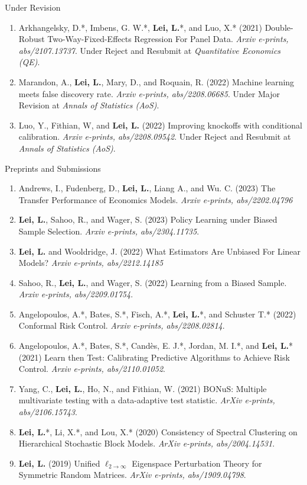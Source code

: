 \documentclass{article}
\begin{document}
\begin{large}
\noindent Under Revision
\end{large}

\begin{enumerate}
\item Arkhangelsky, D.*, Imbens, G. W.*, \textbf{Lei, L.}*, and Luo, X.* (2021) Double-Robust Two-Way-Fixed-Effects Regression For Panel Data. \emph{Arxiv e-prints, abs/2107.13737}. Under Reject and Resubmit at \emph{Quantitative Economics (QE)}.
\item Marandon, A., \textbf{Lei, L.}, Mary, D., and Roquain, R. (2022) Machine learning meets false discovery rate. \emph{Arxiv e-prints, abs/2208.06685}. Under Major Revision at \emph{Annals of Statistics (AoS)}.
\item Luo, Y., Fithian, W, and \textbf{Lei, L.} (2022) Improving knockoffs with conditional calibration. \emph{Arxiv e-prints, abs/2208.09542}. Under Reject and Resubmit at \emph{Annals of Statistics (AoS)}.
\end{enumerate}

\begin{large}
\noindent Preprints and Submissions
\end{large}

\begin{enumerate}
\item Andrews, I., Fudenberg, D., \textbf{Lei, L.}, Liang A., and Wu. C. (2023) The Transfer Performance of Economics Models. \emph{Arxiv e-prints, abs/2202.04796}
\item \textbf{Lei, L.}, Sahoo, R., and Wager, S. (2023) Policy Learning under Biased Sample Selection. \emph{Arxiv e-prints, abs/2304.11735}.  
\item \textbf{Lei, L.} and Wooldridge, J. (2022) What Estimators Are Unbiased For Linear Models? \emph{Arxiv e-prints, abs/2212.14185}
\item Sahoo, R., \textbf{Lei, L.}, and Wager, S. (2022) Learning from a Biased Sample. \emph{Arxiv e-prints, abs/2209.01754}.
\item Angelopoulos, A.*, Bates, S.*, Fisch, A.*, \textbf{Lei, L.}*, and Schuster T.* (2022) Conformal Risk Control. \emph{Arxiv e-prints, abs/2208.02814}.
\item Angelopoulos, A.*, Bates, S.*, Cand\`{e}s, E. J.*, Jordan, M. I.*, and \textbf{Lei, L.}* (2021) Learn then Test: Calibrating Predictive Algorithms to Achieve Risk Control. \emph{Arxiv e-prints, abs/2110.01052}.
\item Yang, C., \textbf{Lei, L.}, Ho, N., and Fithian, W. (2021) BONuS: Multiple multivariate testing with a data-adaptive test statistic. \emph{ArXiv e-prints, abs/2106.15743}.
\item \textbf{Lei, L.}*, Li, X.*, and Lou, X.* (2020) Consistency of Spectral Clustering on Hierarchical Stochastic Block Models. \emph{ArXiv e-prints, abs/2004.14531}.
\item \textbf{Lei, L.} (2019) Unified $\ell_{2\rightarrow\infty}$ Eigenspace Perturbation Theory for Symmetric Random Matrices. \emph{ArXiv e-prints, abs/1909.04798}.
\end{enumerate}
\end{document}
